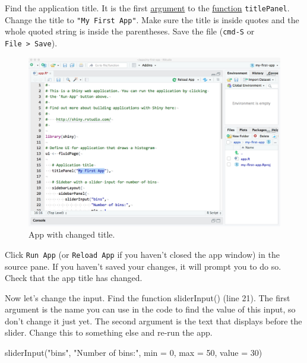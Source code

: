 \documentclass[
]{book}
\newenvironment{Shaded}{\begin{snugshade}}{\end{snugshade}}
\newcommand{\AttributeTok}[1]{\textcolor[rgb]{0.77,0.63,0.00}{#1}}
\newcommand{\DecValTok}[1]{\textcolor[rgb]{0.00,0.00,0.81}{#1}}
\newcommand{\FunctionTok}[1]{\textcolor[rgb]{0.00,0.00,0.00}{#1}}
\newcommand{\NormalTok}[1]{#1}
\newcommand{\StringTok}[1]{\textcolor[rgb]{0.31,0.60,0.02}{#1}}
\begin{document}
Find the application title. It is the first \href{defs.html\#argument}{argument} to the \href{defs.html\#function}{function} \texttt{titlePanel}. Change the title to \texttt{"My\ First\ App"}. Make sure the title is inside quotes and the whole quoted string is inside the parentheses. Save the file (\texttt{cmd-S} or \texttt{File\ \textgreater{}\ Save}).

\begin{figure}

{\centering \includegraphics[width=1\linewidth]{images/demo_app/06-change-title} 

}

\caption{App with changed title.}\label{fig:first-change-title}
\end{figure}

Click \texttt{Run\ App} (or \texttt{Reload\ App} if you haven't closed the app window) in the source pane. If you haven't saved your changes, it will prompt you to do so. Check that the app title has changed.

Now let's change the input. Find the function sliderInput() (line 21). The first argument is the name you can use in the code to find the value of this input, so don't change it just yet. The second argument is the text that displays before the slider. Change this to something else and re-run the app.

\begin{Shaded}
\begin{Highlighting}[]
         \FunctionTok{sliderInput}\NormalTok{(}\StringTok{"bins"}\NormalTok{,}
                     \StringTok{"Number of bins:"}\NormalTok{,}
                     \AttributeTok{min =} \DecValTok{0}\NormalTok{,}
                     \AttributeTok{max =} \DecValTok{50}\NormalTok{,}
                     \AttributeTok{value =} \DecValTok{30}\NormalTok{)}
\end{Highlighting}
\end{Shaded}
\end{document}
